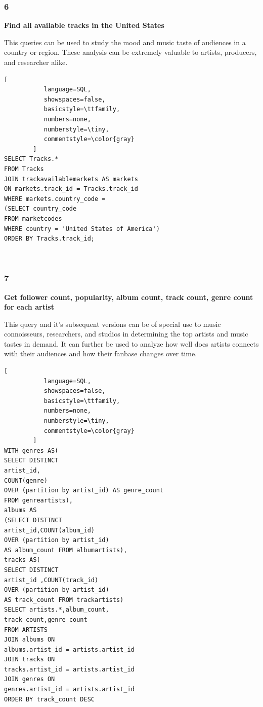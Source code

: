 \documentclass[conference]{IEEEtran}
\begin{document}
\subsubsection*{6} \textbf{Find all available tracks in the United States}

This queries can be used to study the mood and music taste of audiences in a country or region. These analysis can be extremely valuable to artists, producers, and researcher alike. \linebreak 

\begin{lstlisting}[
           language=SQL,
           showspaces=false,
           basicstyle=\ttfamily,
           numbers=none,
           numberstyle=\tiny,
           commentstyle=\color{gray}
        ]
SELECT Tracks.* 
FROM Tracks
JOIN trackavailablemarkets AS markets
ON markets.track_id = Tracks.track_id
WHERE markets.country_code =
(SELECT country_code
FROM marketcodes
WHERE country = 'United States of America')
ORDER BY Tracks.track_id;
\end{lstlisting} \ 

\subsubsection*{7} \textbf{Get follower count, popularity, album count, track count, genre count for each artist}

This query and it's subsequent versions can be of special use to music connoisseurs, researchers, and studios in determining the top artists and music tastes in demand. It can further be used to analyze how well does artists connects with their audiences and how their fanbase changes over time. \linebreak  

\begin{lstlisting}[
           language=SQL,
           showspaces=false,
           basicstyle=\ttfamily,
           numbers=none,
           numberstyle=\tiny,
           commentstyle=\color{gray}
        ]
WITH genres AS(
SELECT DISTINCT 
artist_id,
COUNT(genre) 
OVER (partition by artist_id) AS genre_count 
FROM genreartists),
albums AS
(SELECT DISTINCT
artist_id,COUNT(album_id) 
OVER (partition by artist_id) 
AS album_count FROM albumartists),
tracks AS(
SELECT DISTINCT
artist_id ,COUNT(track_id) 
OVER (partition by artist_id) 
AS track_count FROM trackartists)
SELECT artists.*,album_count,
track_count,genre_count
FROM ARTISTS
JOIN albums ON 
albums.artist_id = artists.artist_id
JOIN tracks ON 
tracks.artist_id = artists.artist_id
JOIN genres ON 
genres.artist_id = artists.artist_id
ORDER BY track_count DESC
\end{lstlisting} \ 
\end{document}

